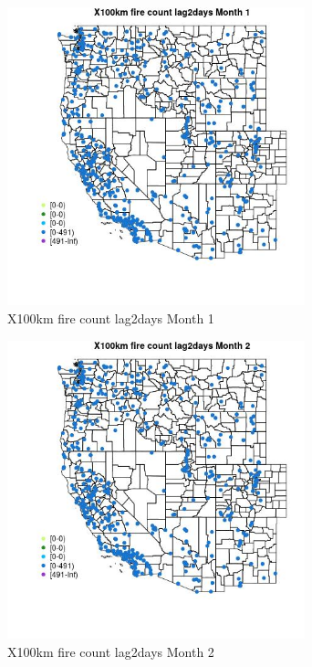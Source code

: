 \begin{figure} 
\centering  
\includegraphics[width=0.77\textwidth]{Code_Outputs/Report_ML_input_PM25_Step4_part_e_de_duplicated_aves_compiled_2019-05-14wNAs_MapObsMo1X100km_fire_count_lag2days.jpg} 
\caption{\label{fig:Report_ML_input_PM25_Step4_part_e_de_duplicated_aves_compiled_2019-05-14wNAsMapObsMo1X100km_fire_count_lag2days}X100km fire count lag2days Month 1} 
\end{figure} 
 

\begin{figure} 
\centering  
\includegraphics[width=0.77\textwidth]{Code_Outputs/Report_ML_input_PM25_Step4_part_e_de_duplicated_aves_compiled_2019-05-14wNAs_MapObsMo2X100km_fire_count_lag2days.jpg} 
\caption{\label{fig:Report_ML_input_PM25_Step4_part_e_de_duplicated_aves_compiled_2019-05-14wNAsMapObsMo2X100km_fire_count_lag2days}X100km fire count lag2days Month 2} 
\end{figure} 
 

